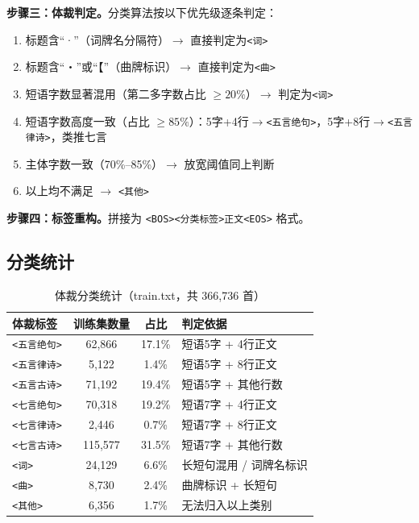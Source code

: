 \documentclass[a4paper, 12pt, centering, AutoFakeBold]{article}
\begin{document}
\textbf{步骤三：体裁判定。}分类算法按以下优先级逐条判定：
\begin{enumerate}
    \item 标题含``·''（词牌名分隔符）$\to$ 直接判定为\texttt{<词>}
    \item 标题含``・''或``【''（曲牌标识）$\to$ 直接判定为\texttt{<曲>}
    \item 短语字数显著混用（第二多字数占比 $\geq 20\%$）$\to$ 判定为\texttt{<词>}
    \item 短语字数高度一致（占比 $\geq 85\%$）：5字+4行$\to$\texttt{<五言绝句>}，5字+8行$\to$\texttt{<五言律诗>}，类推七言
    \item 主体字数一致（70\%--85\%）$\to$ 放宽阈值同上判断
    \item 以上均不满足 $\to$ \texttt{<其他>}
\end{enumerate}

\textbf{步骤四：标签重构。}拼接为 \texttt{<BOS><分类标签>正文<EOS>} 格式。

\subsection{分类统计}

\begin{table}[H]
\centering
\caption{体裁分类统计（train.txt，共 366,736 首）}
\label{tab:category_stats}
\begin{tabular}{|l|c|c|l|}
\hline
\textbf{体裁标签} & \textbf{训练集数量} & \textbf{占比} & \textbf{判定依据} \\
\hline
\texttt{<五言绝句>} & 62,866 & 17.1\% & 短语5字 + 4行正文 \\
\texttt{<五言律诗>} & 5,122  & 1.4\%  & 短语5字 + 8行正文 \\
\texttt{<五言古诗>} & 71,192 & 19.4\% & 短语5字 + 其他行数 \\
\texttt{<七言绝句>} & 70,318 & 19.2\% & 短语7字 + 4行正文 \\
\texttt{<七言律诗>} & 2,446  & 0.7\%  & 短语7字 + 8行正文 \\
\texttt{<七言古诗>} & 115,577& 31.5\% & 短语7字 + 其他行数 \\
\texttt{<词>} & 24,129 & 6.6\%  & 长短句混用 / 词牌名标识 \\
\texttt{<曲>} & 8,730  & 2.4\%  & 曲牌标识 + 长短句 \\
\texttt{<其他>} & 6,356  & 1.7\%  & 无法归入以上类别 \\
\hline
\end{tabular}
\end{table}
\end{document}
